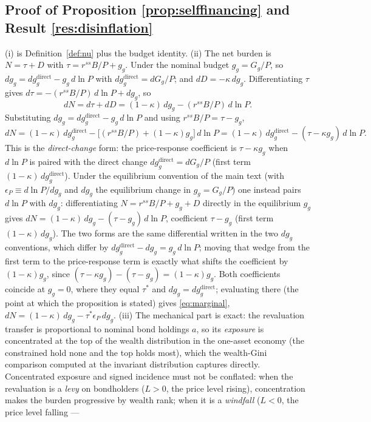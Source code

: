 \documentclass[12pt]{article}
\begin{document}
\subsection{Proof of Proposition \ref{prop:selffinancing} and
Result \ref{res:disinflation}}
(i) is Definition~\ref{def:nu} plus the budget identity. (ii) The net burden
is $N=\tau+D$ with $\tau=r^{ss}B/P+g_g$. Under the nominal budget $g_g=G_g/P$,
so $dg_g = dg_g^{\mathrm{direct}} - g_g\,d\ln P$ with
$dg_g^{\mathrm{direct}}=dG_g/P$; and $dD=-\kappa\,dg_g$. Differentiating
$\tau$ gives $d\tau = -(r^{ss}B/P)\,d\ln P + dg_g$, so
\[
dN = d\tau + dD = (1-\kappa)\,dg_g - (r^{ss}B/P)\,d\ln P.
\]
Substituting $dg_g = dg_g^{\mathrm{direct}} - g_g\,d\ln P$ and using
$r^{ss}B/P = \tau - g_g$,
\[
dN = (1-\kappa)\,dg_g^{\mathrm{direct}}
   - \big[(r^{ss}B/P)+(1-\kappa)g_g\big]\,d\ln P
   = (1-\kappa)\,dg_g^{\mathrm{direct}} - (\tau-\kappa g_g)\,d\ln P .
\]
This is the \emph{direct-change} form: the price-response coefficient is
$\tau-\kappa g_g$ when $d\ln P$ is paired with the direct change
$dg_g^{\mathrm{direct}}=dG_g/P$ (first term $(1-\kappa)\,dg_g^{\mathrm{direct}}$).
Under the equilibrium convention of the main text (with $\epsilon_P\equiv d\ln
P/dg_g$ and $dg_g$ the equilibrium change in $g_g=G_g/P$) one instead pairs
$d\ln P$ with $dg_g$: differentiating $N=r^{ss}B/P+g_g+D$ directly in the
equilibrium $g_g$ gives $dN=(1-\kappa)\,dg_g-(\tau-g_g)\,d\ln P$, coefficient
$\tau-g_g$ (first term $(1-\kappa)\,dg_g$). The two forms are the same
differential written in the two $dg_g$ conventions, which differ by
$dg_g^{\mathrm{direct}}-dg_g=g_g\,d\ln P$; moving that wedge from the first term
to the price-response term is exactly what shifts the coefficient by
$(1-\kappa)g_g$, since $(\tau-\kappa g_g)-(\tau-g_g)=(1-\kappa)g_g$. Both
coefficients coincide at $g_g=0$, where they equal $\tau^{*}$ and
$dg_g=dg_g^{\mathrm{direct}}$; evaluating there (the point at which the
proposition is stated) gives \eqref{eq:marginal},
$dN=(1-\kappa)\,dg_g-\tau^{*}\epsilon_P\,dg_g$.
(iii) The mechanical part is exact: the revaluation transfer is proportional to
nominal bond holdings $a$, so its \emph{exposure} is concentrated at the top of
the wealth distribution in the one-asset economy (the constrained hold none and
the top holds most), which the wealth-Gini comparison computed at the invariant
distribution captures directly. Concentrated exposure and signed incidence must
not be conflated: when the revaluation is a \emph{levy} on bondholders ($L>0$,
the price level rising), concentration makes the burden progressive by wealth
rank; when it is a \emph{windfall} ($L<0$, the price level falling ---
\end{document}
